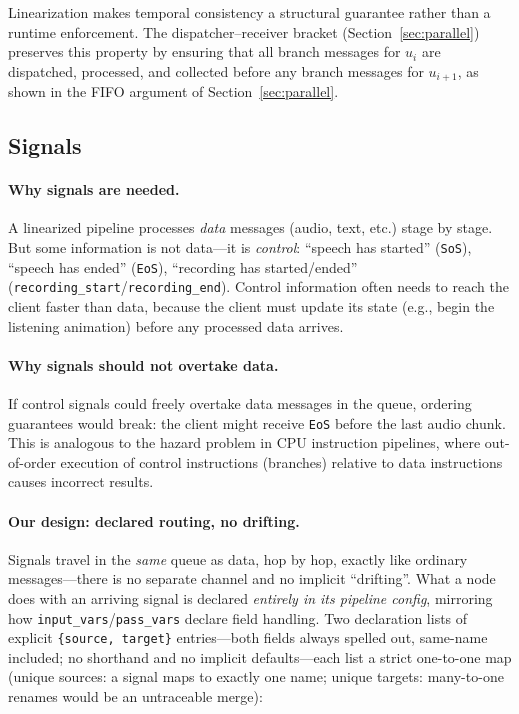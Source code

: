 \documentclass[11pt,a4paper]{article}
\begin{document}
Linearization makes temporal consistency a structural guarantee rather than a runtime enforcement. The dispatcher--receiver bracket (Section~\ref{sec:parallel}) preserves this property by ensuring that all branch messages for $u_i$ are dispatched, processed, and collected before any branch messages for $u_{i+1}$, as shown in the FIFO argument of Section~\ref{sec:parallel}.

\subsection{Signals}
\label{sec:signals}

\paragraph{Why signals are needed.}
A linearized pipeline processes \emph{data} messages (audio, text, etc.) stage by stage. But some information is not data---it is \emph{control}: ``speech has started'' (\texttt{SoS}), ``speech has ended'' (\texttt{EoS}), ``recording has started/ended'' (\texttt{recording\_start}/\texttt{recording\_end}). Control information often needs to reach the client faster than data, because the client must update its state (e.g., begin the listening animation) before any processed data arrives.

\paragraph{Why signals should not overtake data.}
If control signals could freely overtake data messages in the queue, ordering guarantees would break: the client might receive \texttt{EoS} before the last audio chunk. This is analogous to the hazard problem in CPU instruction pipelines, where out-of-order execution of control instructions (branches) relative to data instructions causes incorrect results.

\paragraph{Our design: declared routing, no drifting.}
Signals travel in the \emph{same} queue as data, hop by hop, exactly like ordinary messages---there is no separate channel and no implicit ``drifting''. What a node does with an arriving signal is declared \emph{entirely in its pipeline config}, mirroring how \texttt{input\_vars}/\texttt{pass\_vars} declare field handling. Two declaration lists of explicit \texttt{\{source, target\}} entries---both fields always spelled out, same-name included; no shorthand and no implicit defaults---each list a strict one-to-one map (unique sources: a signal maps to exactly one name; unique targets: many-to-one renames would be an untraceable merge):
\end{document}
